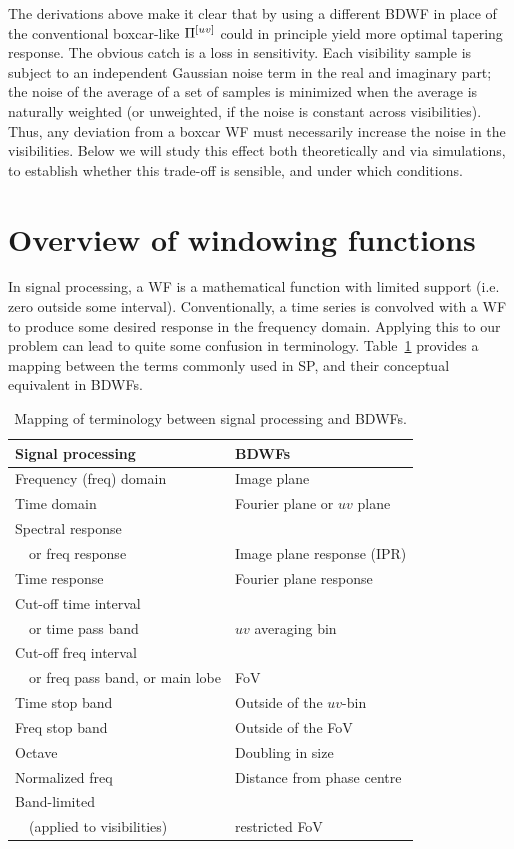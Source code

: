 \documentclass[useAMS,usenatbib]{mn2e}
\begin{document}
The derivations above make it clear that by using a different BDWF in place of the conventional boxcar-like $\Pi^{[uv]}$ 
could in principle yield more optimal tapering response. The obvious catch is a loss in 
sensitivity. Each visibility sample is subject to an independent Gaussian noise term in the real and imaginary part; the noise of
the average of a set of samples is minimized when the average is naturally weighted (or unweighted, if the noise is 
constant across visibilities). Thus, any deviation from a boxcar WF must necessarily increase the noise in the 
visibilities. Below we will study this effect both theoretically and via simulations, to establish whether this 
trade-off is sensible, and under which conditions.

\section{Overview of windowing functions}
\label{subsec:Windowing functions}

In signal processing, a WF is a mathematical function with limited support (i.e. zero outside some interval). Conventionally,
a time series is convolved with a WF to produce some desired response in the frequency domain. Applying this to our problem
can lead to quite some confusion in terminology. Table~\ref{tab:terms} provides a mapping between the terms commonly used in SP, 
and their conceptual equivalent in BDWFs.

\begin{table}
\begin{tabular}{l|l}
\hline
 \bf Signal processing & \bf BDWFs\\
\hline\hline
Frequency (freq) domain & Image plane \\
Time domain & Fourier plane or $uv$ plane \\
Spectral response\\
~~or freq response & Image plane response (IPR)\\
Time response & Fourier plane response\\
Cut-off time interval  \\
~~or time pass band & $uv$ averaging bin\\
Cut-off freq interval \\
~~or freq pass band, or main lobe & FoV\\
Time stop band & Outside of the $uv$-bin\\
Freq stop band & Outside of the FoV\\
Octave & Doubling in size\\
Normalized freq & Distance from phase centre \\
Band-limited \\
~~(applied to visibilities) & restricted FoV \\
\end{tabular}
\caption{Mapping of terminology between signal processing and BDWFs.}
\label{tab:terms}
\end{table}
\end{document}
